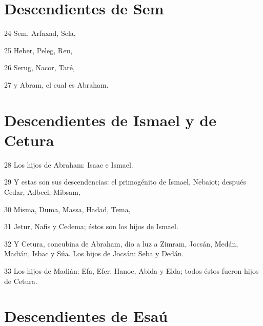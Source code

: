\section*{Descendientes de Sem}

\par 24 Sem, Arfaxad, Sela,
\par 25 Heber, Peleg, Reu, 
\par 26 Serug, Nacor, Taré,
\par 27 y Abram, el cual es Abraham.

\section*{Descendientes de Ismael y de Cetura}

\par 28 Los hijos de Abraham: Isaac e Ismael.
\par 29 Y estas son sus descendencias: el primogénito de Ismael, Nebaiot; después Cedar, Adbeel, Mibsam,
\par 30 Misma, Duma, Massa, Hadad, Tema,
\par 31 Jetur, Nafis y Cedema; éstos son los hijos de Ismael.
\par 32 Y Cetura, concubina de Abraham, dio a luz a Zimram, Jocsán, Medán, Madián, Isbac y Súa. Los hijos de Jocsán: Seba y Dedán.
\par 33 Los hijos de Madián: Efa, Efer, Hanoc, Abida y Elda; todos éstos fueron hijos de Cetura.

\section*{Descendientes de Esaú}

